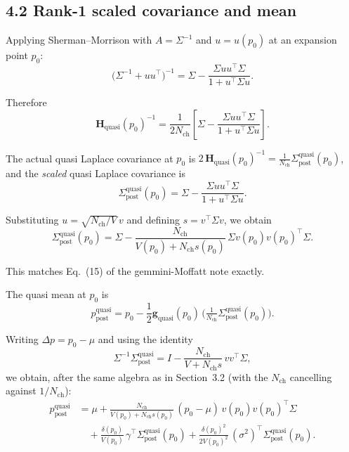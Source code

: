\documentclass[11pt]{article}
\begin{document}
\subsection*{4.2 Rank-1 scaled covariance and mean}

Applying Sherman--Morrison with $A=\Sigma^{-1}$ and
$u = u(p_0)$ at an expansion point $p_0$:
\[
  \bigl(\Sigma^{-1} + u u^\top\bigr)^{-1}
  =
  \Sigma
  - \frac{\Sigma u u^\top\Sigma}{1 + u^\top\Sigma u}.
\]

Therefore
\[
  \mathbf{H}_{\text{quasi}}(p_0)^{-1}
  =
  \frac{1}{2N_{\text{ch}}}
  \left[
    \Sigma
    - \frac{\Sigma u u^\top\Sigma}{1 + u^\top\Sigma u}
  \right].
\]

The actual quasi Laplace covariance at $p_0$ is
$2\,\mathbf{H}_{\text{quasi}}(p_0)^{-1} = \tfrac{1}{N_{\text{ch}}}
\Sigma_{\text{post}}^{\text{quasi}}(p_0)$, and the
\emph{scaled} quasi Laplace covariance is
\[
  \Sigma_{\text{post}}^{\text{quasi}}(p_0)
  =
  \Sigma
  - \frac{\Sigma u u^\top\Sigma}{1 + u^\top\Sigma u}.
\]

Substituting $u = \sqrt{N_{\text{ch}}/V}\,v$ and defining
$s = v^\top\Sigma v$, we obtain
\[
  \boxed{
    \Sigma_{\text{post}}^{\text{quasi}}(p_0)
    =
    \Sigma
    -
    \frac{N_{\text{ch}}}{V(p_0) + N_{\text{ch}} s(p_0)}\,
    \Sigma v(p_0) v(p_0)^\top\Sigma.
  }
\]

This matches Eq.~(15) of the gemmini-Moffatt note exactly.

The quasi mean at $p_0$ is
\[
  p_{\text{post}}^{\text{quasi}}
  =
  p_0 - \frac{1}{2}\mathbf{g}_{\text{quasi}}(p_0)\,
         \bigl(\tfrac{1}{N_{\text{ch}}}\Sigma_{\text{post}}^{\text{quasi}}(p_0)\bigr).
\]

Writing $\Delta p = p_0 - \mu$ and using the identity
\[
  \Sigma^{-1}\Sigma_{\text{post}}^{\text{quasi}}
  =
  I
  - \frac{N_{\text{ch}}}{V + N_{\text{ch}} s}\,v v^\top\Sigma,
\]
we obtain, after the same algebra as in Section~3.2 (with the
$N_{\text{ch}}$ cancelling against $1/N_{\text{ch}}$):
\[
  \boxed{
  \begin{aligned}
    p_{\text{post}}^{\text{quasi}}
    &=
    \mu
    + \frac{N_{\text{ch}}}{V(p_0) + N_{\text{ch}} s(p_0)}\,
      (p_0 - \mu)\,v(p_0)v(p_0)^\top\Sigma\\[4pt]
    &\quad
    + \frac{\delta(p_0)}{V(p_0)}\,\gamma^\top
      \Sigma_{\text{post}}^{\text{quasi}}(p_0)
    + \frac{\delta(p_0)^2}{2V(p_0)^2}\,(\sigma^2)^\top
      \Sigma_{\text{post}}^{\text{quasi}}(p_0).
  \end{aligned}
  }
\]
\end{document}
